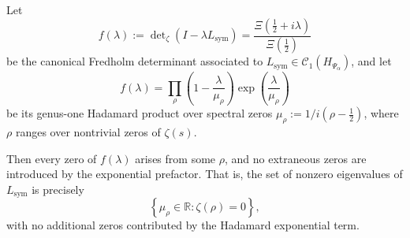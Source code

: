 \begin{lemma}
\label{lem:no_extraneous_zeros}
Let
\[
f(\lambda) := \det\nolimits_\zeta(I - \lambda L_{\mathrm{sym}}) = \frac{\Xi(\tfrac{1}{2} + i\lambda)}{\Xi(\tfrac{1}{2})}
\]
be the canonical Fredholm determinant associated to \( L_{\mathrm{sym}} \in \mathcal{C}_1(H_{\Psi_\alpha}) \), and let
\[
f(\lambda) = \prod_{\rho} \left(1 - \frac{\lambda}{\mu_\rho} \right) \exp\left( \frac{\lambda}{\mu_\rho} \right)
\]
be its genus-one Hadamard product over spectral zeros \( \mu_\rho := 1 / i(\rho - \tfrac{1}{2}) \), where \( \rho \) ranges over nontrivial zeros of \( \zeta(s) \).

Then every zero of \( f(\lambda) \) arises from some \( \rho \), and no extraneous zeros are introduced by the exponential prefactor. That is, the set of nonzero eigenvalues of \( L_{\mathrm{sym}} \) is precisely
\[
\left\{ \mu_\rho \in \mathbb{R} : \zeta(\rho) = 0 \right\},
\]
with no additional zeros contributed by the Hadamard exponential term.

\end{lemma}
% 